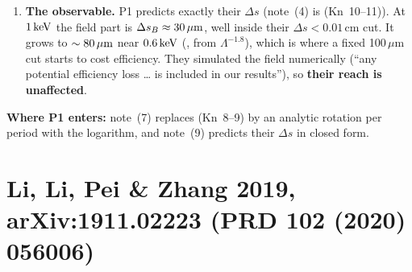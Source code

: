 \documentclass[11pt]{article}
\begin{document}
\begin{verdict}
\begin{enumerate}[leftmargin=*]
  (b) We do not draw a size comparison between note~(7) and (Kn~9). The project's novelty audit (erratum, 11 Oct) found
  that evaluating (Kn~8) gives a value about $9\times$ larger than the printed $10^{-5}$ of (Kn~9), so the ``estimate'' is
  itself uncertain by an order of magnitude. Their statement that $\Delta\phi$ ``stabilizes around a fixed value'' was
  not analysed in the project.
\item \textbf{The observable.} P1 predicts exactly their $\Delta s$ (note~(4) is (Kn~10--11)). At $1\,\mathrm{keV}$ the field part
  is $\Delta s_B\approx30\,\mu\mathrm{m}$, well inside their $\Delta s<0.01$\,cm cut. It grows to $\sim80\,\mu\mathrm{m}$ near $0.6\,\mathrm{keV}$ (\EST{},
  from $\Lambda^{-1.8}$), which is where a fixed 100\,$\mu$m cut starts to cost efficiency. They simulated the field
  numerically (``any potential efficiency loss \dots{} is included in our results''), so \textbf{their reach is
  unaffected}.
\end{enumerate}
\textbf{Where P1 enters:} note~(7) replaces (Kn~8--9) by an analytic rotation per period with the logarithm, and
note~(9) predicts their $\Delta s$ in closed form.
\end{verdict}

\section{Li, Li, Pei \& Zhang 2019, arXiv:1911.02223 (PRD 102 (2020) 056006)}\label{sec:li19}
\end{document}
